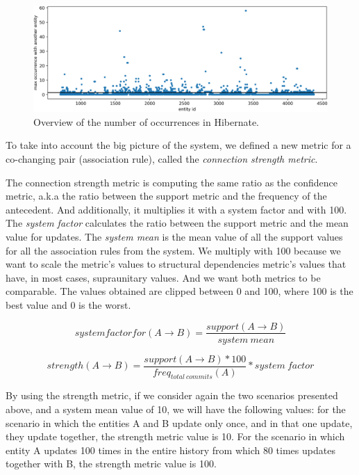 \documentclass[runningheads]{comsis2}
\begin{document}
\begin{figure}
\centering
\includegraphics[width=\textwidth]{fig_hibernate_maxOcc.png}
\caption{Overview of the number of occurrences in Hibernate. }
\label{fig:strength_overview_hibernate}
\centering
\end{figure}



To take into account the big picture of the system, we defined a new metric for a co-changing pair (association rule), called the \textit{connection strength metric}. 

The connection strength metric is computing the same ratio as the confidence metric, a.k.a the ratio between the support metric and the frequency of the antecedent. And additionally, it multiplies it with a system factor and with 100. 
The \textit{system factor} calculates the ratio between the support metric and the mean value for updates. The \textit{system mean} is the mean value of all the support values for all the association rules from the system. 
We multiply with 100 because we want to scale the metric's values to structural dependencies metric's values that have, in most cases, supraunitary values. And we want both metrics to be comparable. The values obtained are clipped between 0 and 100, where 100 is the best value and 0 is the worst.

\begin{equation}
 system factor for (A \rightarrow B) =\frac{support (A \rightarrow B) }{system\ mean}
\end{equation}

\begin{equation}
 strength (A \rightarrow B) =\frac{support (A \rightarrow B) * 100}{freq_{total\ commits}(A)} * system\ factor
\end{equation}

By using the strength metric, if we consider again the two scenarios presented above, and a system mean value of 10, we will have the following values: for the scenario in which the entities A and B update only once, and in that one update, they update together, the strength metric value is 10. For the scenario in which entity A updates 100 times in the entire history from which 80 times updates together with B, the strength metric value is 100.  
\end{document}
